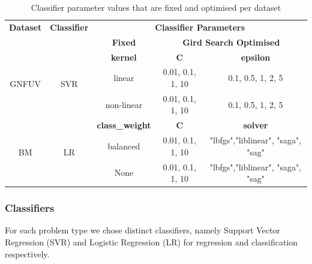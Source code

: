 \documentclass{mpaper}
\begin{document}
\begin{table}[]
\centering
\begin{tabular}{|c|c|ccc|}
\hline
\textbf{Dataset}       & \textbf{Classifier}  & \multicolumn{3}{c|}{\textbf{Classifier Parameters}}                                                 \\ \cline{3-5} 
                       &                      & \multicolumn{1}{c|}{\textbf{Fixed}}         & \multicolumn{2}{c|}{\textbf{Gird Search Optimised}}   \\ \hline
\multirow{3}{*}{GNFUV} & \multirow{3}{*}{SVR} & \multicolumn{1}{c|}{\textbf{kernel}}        & \textbf{C}       & \textbf{epsilon}                   \\ \cline{3-5} 
                       &                      & \multicolumn{1}{c|}{linear}                 & 0.01, 0.1, 1, 10 & 0.1, 0.5, 1, 2, 5                  \\
                       &                      & \multicolumn{1}{c|}{non-linear}             & 0.01, 0.1, 1, 10 & 0.1, 0.5, 1, 2, 5                  \\ \hline
\multirow{3}{*}{BM}    & \multirow{3}{*}{LR}  & \multicolumn{1}{c|}{\textbf{class\_weight}} & \textbf{C}       & \textbf{solver}                    \\ \cline{3-5} 
                       &                      & \multicolumn{1}{c|}{balanced}               & 0.01, 0.1, 1, 10 & "lbfgs","liblinear", "saga", "sag" \\
                       &                      & \multicolumn{1}{c|}{None}                   & 0.01, 0.1, 1, 10 & "lbfgs","liblinear", "saga", "sag" \\ \hline
\end{tabular}
\caption{\label{tab:classifier_parameters} Classifier parameter values that are fixed and optimised per dataset}
\end{table}

\subsubsection{Classifiers}

For each problem type we chose distinct classifiers, namely Support Vector Regression (SVR) and Logistic Regression (LR) for regression and classification respectively.
\end{document}

